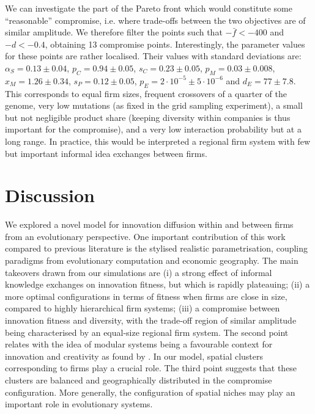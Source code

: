 \documentclass[letterpaper]{article}
\begin{document}
We can investigate the part of the Pareto front which would constitute some ``reasonable'' compromise, i.e. where trade-offs between the two objectives are of similar amplitude. We therefore filter the points such that $- \bar{f} < -400$ and $-d < -0.4$, obtaining 13 compromise points. Interestingly, the parameter values for these points are rather localised. Their values with standard deviations are: $\alpha_S = 0.13 \pm 0.04$, $p_C = 0.94 \pm 0.05$, $s_C = 0.23 \pm 0.05$, $p_M = 0.03 \pm 0.008$, $x_M = 1.26 \pm 0.34 $, $s_P = 0.12 \pm 0.05$, $p_E = 2 \cdot 10^{-5} \pm 5 \cdot 10^{-6}$ and $d_E = 77 \pm 7.8$. This corresponds to equal firm sizes, frequent crossovers of a quarter of the genome, very low mutations (as fixed in the grid sampling experiment), a small but not negligible product share (keeping diversity within companies is thus important for the compromise), and a very low interaction probability but at a long range. In practice, this would be interpreted a regional firm system with few but important informal idea exchanges between firms.


\section{Discussion}


We explored a novel model for innovation diffusion within and between firms from an evolutionary perspective. One important contribution of this work compared to previous literature is the stylised realistic parametrisation, coupling paradigms from evolutionary computation and economic geography. The main takeovers drawn from our simulations are (i) a strong effect of informal knowledge exchanges on innovation fitness, but which is rapidly plateauing; (ii) a more optimal configurations in terms of fitness when firms are close in size, compared to highly hierarchical firm systems; (iii) a compromise between innovation fitness and diversity, with the trade-off region of similar amplitude being characterised by an equal-size regional firm system. The second point relates with the idea of modular systems being a favourable context for innovation and creativity as found by \cite{dionne2019diversity}. In our model, spatial clusters corresponding to firms play a crucial role. The third point suggests that these clusters are balanced and geographically distributed in the compromise configuration. More generally, the configuration of spatial niches may play an important role in evolutionary systems.
\end{document}
